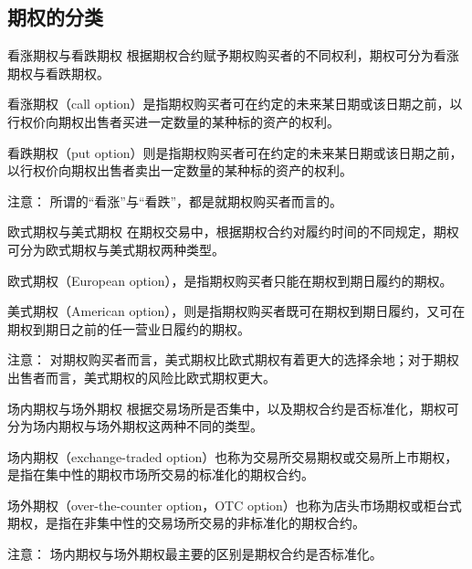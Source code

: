 \documentclass[t]{beamer}
\begin{document}
\subsection{期权的分类}
\begin{frame}{看涨期权与看跌期权}
	根据期权合约赋予期权购买者的不同权利，期权可分为看涨期权与看跌期权。

看涨期权（call option）是指期权购买者可在约定的未来某日期或该日期之前，以行权价向期权出售者买进一定数量的某种标的资产的权利。

看跌期权（put option）则是指期权购买者可在约定的未来某日期或该日期之前，以行权价向期权出售者卖出一定数量的某种标的资产的权利。

\begin{block}{注意：}
	所谓的“看涨”与“看跌”，都是就期权购买者而言的。
\end{block}
\end{frame}



\begin{frame}{欧式期权与美式期权}
	在期权交易中，根据期权合约对履约时间的不同规定，期权可分为欧式期权与美式期权两种类型。

欧式期权（European option），是指期权购买者只能在期权到期日履约的期权。

美式期权（American option），则是指期权购买者既可在期权到期日履约，又可在期权到期日之前的任一营业日履约的期权。

\begin{block}{注意：}
	对期权购买者而言，美式期权比欧式期权有着更大的选择余地；对于期权出售者而言，美式期权的风险比欧式期权更大。
\end{block}
\end{frame}


\begin{frame}{场内期权与场外期权}
	根据交易场所是否集中，以及期权合约是否标准化，期权可分为场内期权与场外期权这两种不同的类型。

场内期权（exchange-traded option）也称为交易所交易期权或交易所上市期权，是指在集中性的期权市场所交易的标准化的期权合约。

场外期权（over-the-counter option，OTC option）也称为店头市场期权或柜台式期权，是指在非集中性的交易场所交易的非标准化的期权合约。

\begin{block}{注意：}
	场内期权与场外期权最主要的区别是期权合约是否标准化。
\end{block}
\end{frame}
\end{document}
